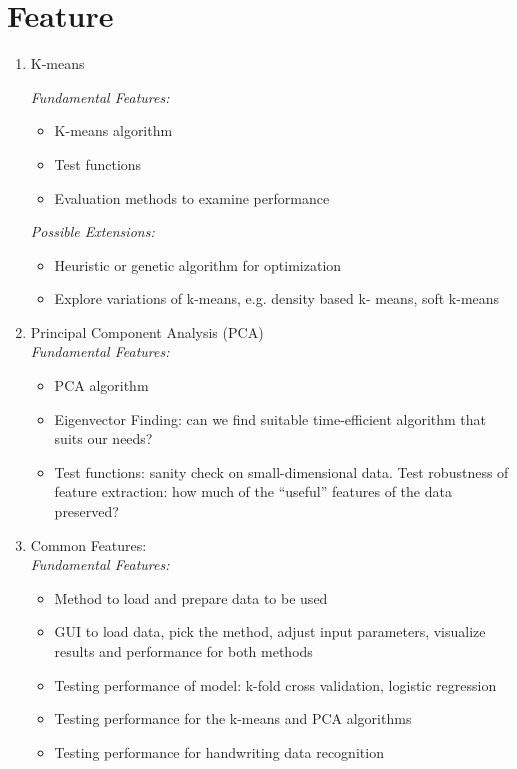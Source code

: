 \documentclass[12pt]{article} %
\begin{document}
\section{Feature}
\begin{enumerate}

	\item K-means 
	
	\emph{Fundamental Features:} 
		\begin{itemize}
			\item K-means algorithm
			\item Test functions
			\item Evaluation methods to examine performance 
		\end{itemize}
	\emph{Possible Extensions:}
		\begin{itemize}
			\item Heuristic or genetic algorithm for optimization
			\item Explore variations of k-means, e.g. density based k-		means, soft k-means 
		\end{itemize}
	\item Principal Component Analysis (PCA)\\
	\emph{Fundamental Features:}
		\begin{itemize}
			\item PCA algorithm
			\item Eigenvector Finding: can we find suitable time-efficient 			algorithm that suits our needs?  
			\item Test functions: sanity check on small-dimensional data. Test robustness of feature extraction: how much of the ``useful'' features of the data preserved?  
		\end{itemize}

	\item Common Features: \\
		\emph{Fundamental Features:}
		\begin{itemize}
			\item Method to load and prepare data to be used 
			\item GUI to load data, pick the method, adjust input parameters, visualize results and performance for both methods 
			\item Testing performance of model: k-fold cross validation, logistic regression 
			\item Testing performance for the k-means and PCA algorithms 
			\item Testing performance for handwriting data recognition 
		\end{itemize}

\end{enumerate}
\end{document}
